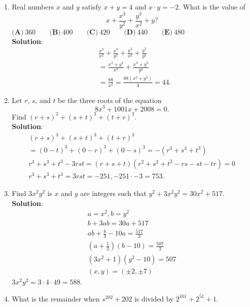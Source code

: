 \begin{enumerate}
  \item Real numbers $x$ and $y$ satisfy $x + y = 4$ and $x \cdot y = -2$. What is the value of\[x + \frac{x^3}{y^2} + \frac{y^3}{x^2} + y?\]
  $\textbf{(A)}\ 360\qquad\textbf{(B)}\ 400\qquad\textbf{(C)}\ 420\qquad\textbf{(D)}\ 440\qquad\textbf{(E)}\ 480$
  \\ \textbf{Solution}:
  \begin{align*}
    &\frac{x^3}{x^2}+\frac{x^3}{y^2}+\frac{y^3}{x^2}+\frac{y^3}{y^2} \\
    &= \frac{x^3+y^3}{x^3}+\frac{x^3+y^3}{y^2} \\
    &= \frac{88}{x^2} = \frac{88(x^2+y^2)}{4} = \boxed{44}.
  \end{align*}
  \item Let $r$, $s$, and $t$ be the three roots of the equation\[8x^3 + 1001x + 2008 = 0.\]Find $(r + s)^3 + (s + t)^3 + (t + r)^3$.
  \\ \textbf{Solution}:
  \begin{align*}
    (r+s)^3 + (s+t)^3 + (t+r)^3  \\ = (0-t)^3 + (0-r)^3 + (0-s)^3 = -(r^3 + s^3 + t^3) \\
    r^3 + s^3 + t^3 - 3rst = (r+s+t)(r^2 + s^2 + t^2 - rs - st - tr) = 0 \\
    r^3+s^3+t^3 = 3rst = -251, -251 \cdot -3 = \boxed{753}.
  \end{align*}
  \item Find $3x^2y^2$ is $x$ and $y$ are integers such that $y^2+3x^2y^2=30x^2+517$.
  \\ \textbf{Solution}:
  \begin{align*}
    a = x^2, b = y^2 \\
    b+3ab = 30a+517 \\
    ab + \frac{b}{3} - 10a = \frac{517}{3} \\
    (a+\frac{1}{3})(b-10) = \frac{507}{3} \\
    (3x^2 + 1)(y^2 - 10) = 507 \\
    (x, y) = (\pm 2, \pm 7)
  \end{align*}
  $3x^2y^2 = 3 \cdot 4 \cdot 49 = \boxed{588}$.
  \item What is the remainder when $s^{202} + 202$ is divided by $2^{101} + 2^{51} + 1$.
  
\end{enumerate}
